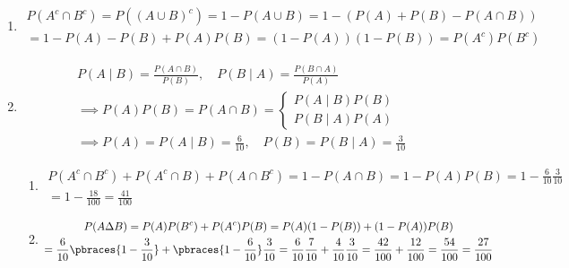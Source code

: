 \begin{solution}

\phantom{}

\begin{enumerate}[label = (\alph*)]

    \item

    \begin{multline*}
        P(A^c \cap B^c)
        =
        P((A \cup B)^c)
        =
        1 - P(A \cup B)
        =
        1 - (P(A) + P(B) - P(A \cap B)) \\
        =
        1 - P(A) - P(B) + P(A) P(B)
        =
        (1 - P(A)) (1 - P(B))
        =
        P(A^c) P(B^c)
    \end{multline*}

    \item

    \begin{align*}
        &
        P(A \mid B) = \frac{P(A \cap B)}{P(B)},
        \quad
        P(B \mid A) = \frac{P(B \cap A)}{P(A)} \\
        & \implies
        P(A) P(B)
        =
        P(A \cap B)
        =
        \begin{cases}
            P(A \mid B) P(B) \\
            P(B \mid A) P(A)
        \end{cases} \\
        & \implies
        P(A) = P(A \mid B) = \frac{6}{10},
        \quad
        P(B) = P(B \mid A) = \frac{3}{10}
    \end{align*}

    \begin{enumerate}[label = (\roman*)]

        \item

        \begin{multline*}
            P(A^c \cap B^c) + P(A^c \cap B) + P(A \cap B^c)
            =
            1 - P(A \cap B)
            =
            1 - P(A) P(B)
            =
            1 - \frac{6}{10} \frac{3}{10} \\
            =
            1 - \frac{18}{100}
            =
            \frac{41}{100}
        \end{multline*}

        \item

        \begin{multline*}
            P(A \Delta B)
            =
            P(A) P(B^c) + P(A^c) P(B)
            =
            P(A) (1 - P(B)) + (1 - P(A)) P(B) \\
            =
            \frac{6}{10} \pbraces{1 - \frac{3}{10}} + \pbraces{1 - \frac{6}{10}} \frac{3}{10}
            =
            \frac{6}{10} \frac{7}{10} + \frac{4}{10} \frac{3}{10}
            =
            \frac{42}{100} + \frac{12}{100}
            =
            \frac{54}{100}
            =
            \frac{27}{100}
        \end{multline*}


\end{enumerate}
\end{enumerate}
\end{solution}
